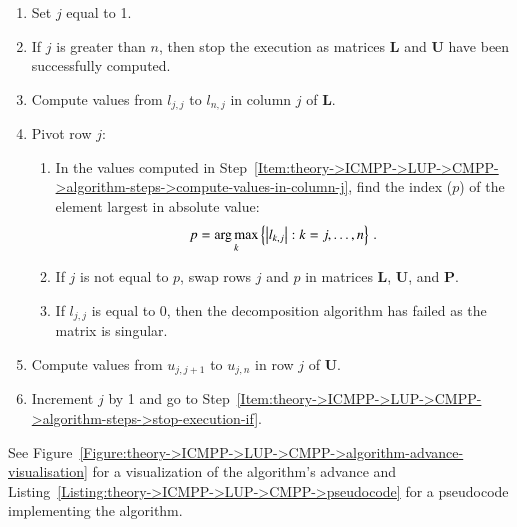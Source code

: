 \begin{enumerate}
	\item Set $j$ equal to 1.
	\item \label{Item:theory->ICMPP->LUP->CMPP->algorithm-steps->stop-execution-if}
		If $j$ is greater than $n$, then stop the execution as matrices $\mathbf{L}$ and $\mathbf{U}$ have been successfully computed.
	\item \label{Item:theory->ICMPP->LUP->CMPP->algorithm-steps->compute-values-in-column-j}
		Compute values from $l_{j,j}$ to $l_{n,j}$ in column $j$ of $\mathbf{L}$.
	\item \label{Item:theory->ICMPP->LUP->CMPP->algorithm-steps->pivot-row-j}
		Pivot row $j$:
	\begin{enumerate}
		\item In the values computed in Step~\ref{Item:theory->ICMPP->LUP->CMPP->algorithm-steps->compute-values-in-column-j}, find the index ($p$) of the element largest in absolute value:
		\begin{equation}
			p = \operatorname*{arg\,max}_k \left\{ \left| l_{k, j} \right|: k=j,\dots, n \right\} \,.
		\end{equation}
		\item If $j$ is not equal to $p$, swap rows $j$ and $p$ in matrices $\mathbf{L}$, $\mathbf{U}$, and $\mathbf{P}$.
		\item If $l_{j,j}$ is equal to 0, then the decomposition algorithm has failed as the matrix is singular.
	\end{enumerate}
	\item Compute values from $u_{j,j+1}$ to $u_{j,n}$ in row $j$ of $\mathbf{U}$.
	\item Increment $j$ by 1 and go to Step~\ref{Item:theory->ICMPP->LUP->CMPP->algorithm-steps->stop-execution-if}.
\end{enumerate}

See Figure~\ref{Figure:theory->ICMPP->LUP->CMPP->algorithm-advance-visualisation} for a visualization of the algorithm's advance  and Listing~\ref{Listing:theory->ICMPP->LUP->CMPP->pseudocode} for a pseudocode implementing the algorithm.

